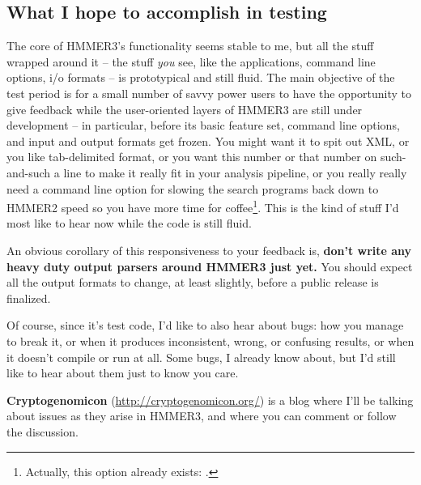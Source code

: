 \subsection{What I hope to accomplish in testing}

The core of HMMER3's functionality seems stable to me, but all the
stuff wrapped around it -- the stuff \emph{you} see, like the
applications, command line options, i/o formats -- is prototypical and
still fluid.  The main objective of the test period is for a
small number of savvy power users to have the opportunity to give
feedback while the user-oriented layers of HMMER3 are still under
development -- in particular, before its basic feature set, command
line options, and input and output formats get frozen. You might want
it to spit out XML, or you like tab-delimited format, or you want this
number or that number on such-and-such a line to make it really fit in
your analysis pipeline, or you really really need a command line
option for slowing the search programs back down to HMMER2 speed so
you have more time for coffee\footnote{Actually, this option already
exists: .}. This is the kind of stuff I'd most like to
hear now while the code is still fluid.

\begin{sidebar}
An obvious corollary of this responsiveness to your feedback is,
\textbf{don't write any heavy duty output parsers around HMMER3 just
yet.} You should expect all the output formats to change, at least
slightly, before a public release is finalized.
\end{sidebar}

Of course, since it's test code, I'd like to also hear about bugs: how
you manage to break it, or when it produces inconsistent, wrong, or
confusing results, or when it doesn't compile or run at all.  Some
bugs, I already know about, but I'd still like to hear about them just
to know you care.

\textbf{Cryptogenomicon} (\url{http://cryptogenomicon.org/}) is a blog
where I'll be talking about issues as they arise in HMMER3, and where
you can comment or follow the discussion.





















  









